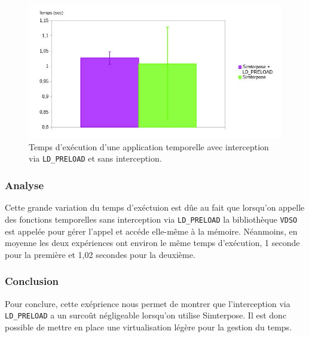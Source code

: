 \begin{figure}[H]
  \centering
    \includegraphics[scale=0.50]{mesures/graph/global_time.jpg}
    \caption{Temps d'exécution d'une application temporelle avec interception via \texttt{LD\_PRELOAD} et sans interception.}
    \label{Temps_FM}
\end{figure}

\subsubsection{Analyse}

Cette grande variation du temps d'exéctuion est dûe au fait que lorsqu'on appelle des fonctions temporelles sans interception via \texttt{LD\_PRELOAD} la bibliothèque \texttt{VDSO} est appelée pour gérer l'appel et accéde elle-même à la mémoire. Néanmoins, en moyenne les deux expériences ont environ le même temps d'exécution, 1 seconde pour la première et 1,02 secondes pour la deuxième.

\subsubsection{Conclusion}
Pour conclure, cette exéprience nous permet de montrer que l'interception via \texttt{LD\_PRELOAD} a un surcoût négligeable lorsqu'on utilise Simterpose. Il est donc possible de mettre en place une virtualisation légère pour la gestion du temps.


